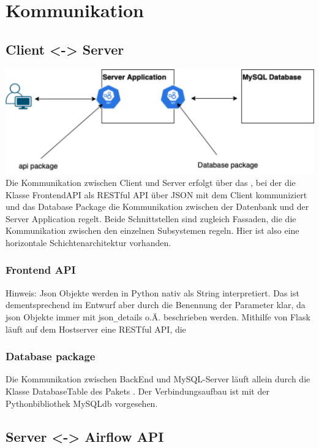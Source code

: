\section{Kommunikation}

\subsection{Client <-> Server} 
\includegraphics[width=1\textwidth]{res/Kommunikation.png}
Die Kommunikation zwischen Client und Server erfolgt über das , bei der die Klasse FrontendAPI 
als RESTful API über JSON mit dem Client kommuniziert und das Database Package die Kommunikation 
zwischen der Datenbank und der Server Application regelt. Beide Schnittstellen sind zugleich Fassaden, die die Kommunikation
zwischen den einzelnen Subsystemen regeln.
Hier ist also eine horizontale Schichtenarchitektur vorhanden.

\subsubsection{Frontend API}
Hinweis: Json Objekte werden in Python nativ als String interpretiert. Das ist dementsprechend im Entwurf aber durch die 
Benennung der Parameter klar, da json Objekte immer mit json\texttt{\_}details o.Ä. beschrieben werden.
Mithilfe von Flask läuft auf dem Hostserver eine RESTful API, die 

\subsubsection{Database package}
Die Kommunikation zwischen BackEnd und MySQL-Server läuft allein durch die Klasse DatabaseTable des Pakets . 
Der Verbindungsaufbau ist mit der Pythonbibliothek MySQLdb vorgesehen.


\subsection{Server <-> Airflow API}

\newpage